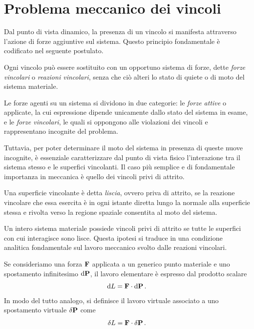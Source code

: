 \section{Problema meccanico dei vincoli}
Dal punto di vista dinamico, la presenza di un vincolo si manifesta attraverso l'azione di forze aggiuntive sul sistema. Questo principio fondamentale è codificato nel seguente postulato.

\begin{proposition}
    Ogni vincolo può essere sostituito con un opportuno sistema di forze, dette \emph{forze vincolari} o \emph{reazioni vincolari}, senza che ciò alteri lo stato di quiete o di moto del sistema materiale.
\end{proposition}

Le forze agenti su un sistema si dividono in due categorie: le \emph{forze attive} o applicate, la cui espressione dipende unicamente dallo stato del sistema in esame, e le \emph{forze vincolari}, le quali si oppongono alle violazioni dei vincoli e rappresentano incognite del problema.

Tuttavia, per poter determinare il moto del sistema in presenza di queste nuove incognite, è essenziale caratterizzare dal punto di vista fisico l'interazione tra il sistema stesso e le superfici vincolanti. Il caso più semplice e di fondamentale importanza in meccanica è quello dei vincoli privi di attrito.

\begin{definition}
    Una superficie vincolante è detta \emph{liscia}, ovvero priva di attrito, se la reazione vincolare che essa esercita è in ogni istante diretta lungo la normale alla superficie stessa e rivolta verso la regione spaziale consentita al moto del sistema.
\end{definition}

Un intero sistema materiale possiede vincoli privi di attrito se tutte le superfici con cui interagisce sono lisce. Questa ipotesi si traduce in una condizione analitica fondamentale sul lavoro meccanico svolto dalle reazioni vincolari.

Se consideriamo una forza $\vb{F}$ applicata a un generico punto materiale e uno spostamento infinitesimo $\dd{\vb{P}}$, il lavoro elementare è espresso dal prodotto scalare
\begin{equation*}
    \dd{L} = \vb{F} \cdot \dd{\vb{P}}.
\end{equation*}
In modo del tutto analogo, si definisce il lavoro virtuale associato a uno spostamento virtuale $\var{\vb{P}}$ come
\begin{equation*}
    \var{L} = \vb{F} \cdot \var{\vb{P}}.
\end{equation*}

